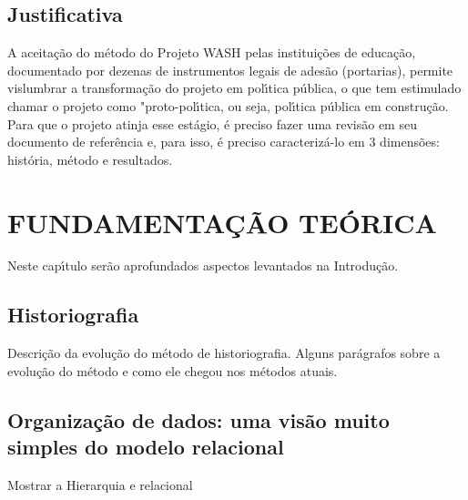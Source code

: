 \documentclass[
12pt,		%
openright,	%
twoside,  %
a4paper,			%
chapter=TITLE,		%
english,			%
french,				%
spanish,			%
brazil				%
]{USPSC-classe/USPSC}
\begin{document}
\section[Justificativa]{Justificativa}\label{Justificativa}
A aceita\c{c}\~ao do m\'etodo do Projeto WASH pelas institui\c{c}\~oes de educa\c{c}\~ao, documentado por dezenas de instrumentos legais de ades\~ao (portarias), permite vislumbrar a transforma\c{c}\~ao do projeto em pol\'{\i}tica p\'ublica, o que tem estimulado chamar o projeto como "proto-pol\'{\i}tica, ou seja, pol\'{\i}tica p\'ublica em constru\c{c}\~ao. Para que o projeto atinja esse est\'agio, \'e preciso fazer uma revis\~ao em seu documento de refer\^encia e, para isso, \'e preciso caracteriz\'a-lo em 3 dimens\~oes: hist\'oria, m\'etodo e resultados.
\chapter[FUNDAMENTA\c{C}\~AO TE\'ORICA ]{FUNDAMENTA\c{C}\~AO TE\'ORICA }\label{FUNDAMENTA\c{C}\~AO TE\'ORICA }
Neste cap\'{\i}tulo ser\~ao aprofundados aspectos levantados na Introdu\c{c}\~ao.
\section[Historiografia]{Historiografia}\label{Historiografia}
Descri\c{c}\~ao da evolu\c{c}\~ao do m\'etodo de historiografia. Alguns par\'agrafos sobre a evolu\c{c}\~ao do m\'etodo e como ele chegou nos m\'etodos atuais.
\section[Organiza\c{c}\~ao de dados: uma vis\~ao muito simples do modelo relacional]{Organiza\c{c}\~ao de dados: uma vis\~ao muito simples do modelo relacional}\label{Organiza\c{c}\~ao de dados: uma vis\~ao muito simples do modelo relacional}
Mostrar a Hierarquia e relacional
\end{document}
